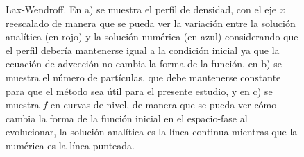 \documentclass[11pt,twoside,openright,spanish]{report}
\numberwithin{equation}{chapter}
\numberwithin{figure}{chapter}
\numberwithin{table}{chapter}
\begin{document}
\begin{figure}[p]
	\caption{Lax-Wendroff. En a) se muestra el perfil de densidad, con el eje $x$ reescalado de manera que se pueda ver la variación entre la solución analítica (en rojo) y la solución numérica (en azul) considerando que el perfil debería mantenerse igual a la condición inicial ya que la ecuación de advección no cambia la forma de la función, en b) se muestra el número de partículas, que debe mantenerse constante para que el método sea útil para el presente estudio, y en c) se muestra $f$ en curvas de nivel, de manera que se pueda ver cómo cambia la forma de la función inicial en el espacio-fase al evolucionar, la solución analítica es la línea continua mientras que la numérica es la línea punteada.}
	\label{lw}
\end{figure}
\end{document}
